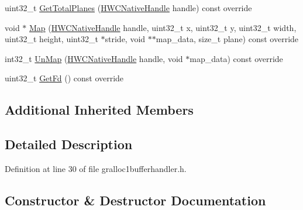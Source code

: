 \begin{DoxyCompactItemize}
\item 
uint32\+\_\+t \mbox{\hyperlink{classhwcomposer_1_1Gralloc1BufferHandler_ad86921fa69dbb60b82581bd6f893decc}{Get\+Total\+Planes}} (\mbox{\hyperlink{alios_2platformdefines_8h_ac0a2eaf260f556d17fe489911f017bdf}{H\+W\+C\+Native\+Handle}} handle) const override
\item 
void $\ast$ \mbox{\hyperlink{classhwcomposer_1_1Gralloc1BufferHandler_a55e32dbd6cc8c32cb3fd3cac11d3f9f8}{Map}} (\mbox{\hyperlink{alios_2platformdefines_8h_ac0a2eaf260f556d17fe489911f017bdf}{H\+W\+C\+Native\+Handle}} handle, uint32\+\_\+t x, uint32\+\_\+t y, uint32\+\_\+t width, uint32\+\_\+t height, uint32\+\_\+t $\ast$stride, void $\ast$$\ast$map\+\_\+data, size\+\_\+t plane) const override
\item 
int32\+\_\+t \mbox{\hyperlink{classhwcomposer_1_1Gralloc1BufferHandler_a147ec425ec0fda400f1d4dd5c60764d9}{Un\+Map}} (\mbox{\hyperlink{alios_2platformdefines_8h_ac0a2eaf260f556d17fe489911f017bdf}{H\+W\+C\+Native\+Handle}} handle, void $\ast$map\+\_\+data) const override
\item 
uint32\+\_\+t \mbox{\hyperlink{classhwcomposer_1_1Gralloc1BufferHandler_aee03106dfff3a4b68b2a29a0d0350d07}{Get\+Fd}} () const override
\end{DoxyCompactItemize}
\subsection*{Additional Inherited Members}


\subsection{Detailed Description}


Definition at line 30 of file gralloc1bufferhandler.\+h.



\subsection{Constructor \& Destructor Documentation}
\mbox{\label{classhwcomposer_1_1Gralloc1BufferHandler_a07552c435b9ccdd99c898a81d805cdd2}} 
